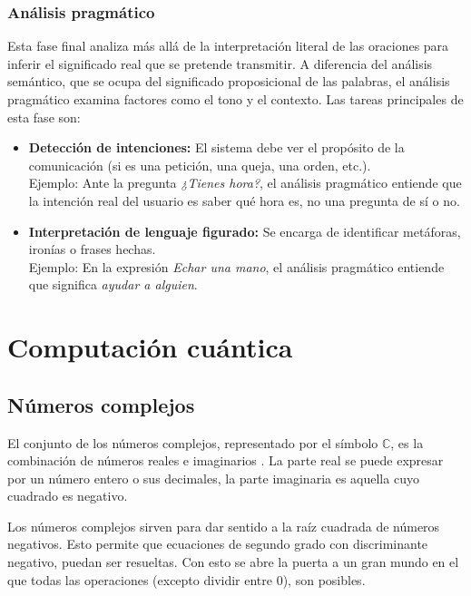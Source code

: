 \subsubsection{Análisis pragmático}

Esta fase final analiza más allá de la interpretación literal de las oraciones para inferir el significado real que se pretende transmitir. A diferencia del análisis semántico, que se ocupa del significado proposicional de las palabras, el análisis pragmático examina factores como el tono y el contexto. Las tareas principales de esta fase son:

\begin{itemize}
    \item \textbf{Detección de intenciones:} El sistema debe ver el propósito de la comunicación (si es una petición, una queja, una orden, etc.).
          \\
          Ejemplo: Ante la pregunta \textit{¿Tienes hora?}, el análisis pragmático entiende que la intención real del usuario es saber qué hora es, no una pregunta de sí o no.

    \item \textbf{Interpretación de lenguaje figurado:} Se encarga de identificar metáforas, ironías o frases hechas.
          \\
          Ejemplo: En la expresión \textit{Echar una mano}, el análisis pragmático entiende que significa \textit{ayudar a alguien}.
\end{itemize}


\section{Computación cuántica}

\subsection{Números complejos}
\label{chap:numeros_complejos}

El conjunto de los números complejos, representado por el símbolo $\mathbb{C}$, es la combinación de números reales e imaginarios \cite{ferrovial_numeros_complejos}. La parte real se puede expresar por un número entero o sus decimales, la parte imaginaria es aquella cuyo cuadrado es negativo.


Los números complejos sirven para dar sentido a la raíz cuadrada de números negativos. Esto permite que ecuaciones de segundo grado con discriminante negativo, puedan ser resueltas. Con esto se abre la puerta a un gran mundo en el que todas las operaciones (excepto dividir entre 0), son posibles.


